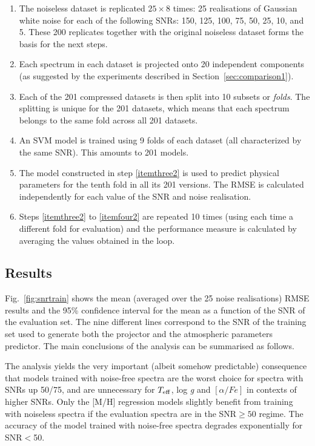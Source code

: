 \documentclass[a4paper,fleqn,usenatbib]{mnras}
\begin{document}
{\begin{enumerate}
\item The noiseless dataset is replicated $25\times 8$ times: 25
  realisations of Gaussian white noise for each of the following SNRs:
  150, 125, 100, 75, 50, 25, 10, and 5. These 200 replicates together
  with the original noiseless dataset forms the basis for the next
  steps.
\item Each spectrum in each dataset is projected onto 20 independent
  components (as suggested by the experiments described in
  Section~\ref{sec:comparison1}).
\item Each of the 201 compressed datasets is then split into 10
  subsets or \textit{folds}. The splitting is unique for the 201
  datasets, which means that each spectrum belongs to the same fold
  across all 201 datasets.
\item \label{itemthree2} An SVM model is trained using 9 folds of each
  dataset (all characterized by the same SNR). This amounts to 201
  models.
\item \label{itemfour2} The model constructed in step \ref{itemthree2}
  is used to predict physical parameters for the tenth fold in all its
  201 versions. The RMSE is calculated independently for each value of
  the SNR and noise realisation.
\item \label{itemfive2} Steps \ref{itemthree2} to \ref{itemfour2} are
  repeated 10 times (using each time a different fold for evaluation)
  and the performance measure is calculated by averaging the values
  obtained in the loop.
\end{enumerate}

\subsection{Results}

Fig.~\ref{fig:snrtrain} shows the mean (averaged over the 25 noise
realisations) RMSE results and the 95\% confidence interval for the
mean as a function of the SNR of the evaluation set. The nine
different lines correspond to the SNR of the training set used to
generate both the projector and the atmospheric parameters predictor.
The main conclusions of the analysis can be summarised as follows.

The analysis yields the very important (albeit somehow predictable) 
consequence that models
trained with noise-free spectra are the worst choice for spectra 
with SNRs up 50/75, and are unnecessary for $T_{\rm eff}$, 
log \textit{g} and $\left[ \alpha/Fe \right]$ in contexts of higher 
SNRs. Only the [M/H] regression models slightly benefit from training 
with noiseless spectra if the evaluation spectra are in the SNR$\ge 50$ regime. 
The accuracy of the model trained with noise-free spectra degrades 
exponentially for SNR$<$50.

}
\end{document}

